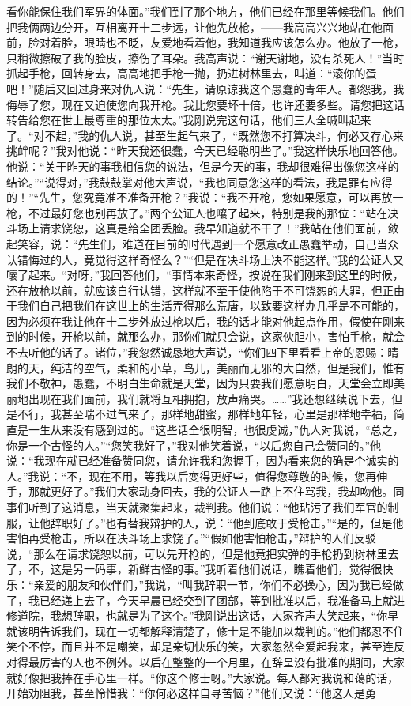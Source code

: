 看你能保住我们军界的体面。”我们到了那个地方，他们已经在那里等候我们。他们把我俩两边分开，互相离开十二步远，让他先放枪，——我高高兴兴地站在他面前，脸对着脸，眼睛也不眨，友爱地看着他，我知道我应该怎么办。他放了一枪，只稍微擦破了我的脸皮，擦伤了耳朵。我高声说：“谢天谢地，没有杀死人！”当时抓起手枪，回转身去，高高地把手枪一抛，扔进树林里去，叫道：“滚你的蛋吧！”随后又回过身来对仇人说：“先生，请原谅我这个愚蠢的青年人。都怨我，我侮辱了您，现在又迫使您向我开枪。我比您要坏十倍，也许还要多些。请您把这话转告给您在世上最尊重的那位太太。”我刚说完这句话，他们三人全喊叫起来了。“对不起，”我的仇人说，甚至生起气来了，“既然您不打算决斗，何必又存心来挑衅呢？”我对他说：“昨天我还很蠢，今天已经聪明些了。”我这样快乐地回答他。他说：“关于昨天的事我相信您的说法，但是今天的事，我却很难得出像您这样的结论。”“说得对，”我鼓鼓掌对他大声说，“我也同意您这样的看法，我是罪有应得的！”“先生，您究竟准不准备开枪？”我说：“我不开枪，您如果愿意，可以再放一枪，不过最好您也别再放了。”两个公证人也嚷了起来，特别是我的那位：“站在决斗场上请求饶恕，这真是给全团丢脸。我早知道就不干了！”我站在他们面前，敛起笑容，说：“先生们，难道在目前的时代遇到一个愿意改正愚蠢举动，自己当众认错悔过的人，竟觉得这样奇怪么？”“但是在决斗场上决不能这样。”我的公证人又嚷了起来。“对呀，”我回答他们，“事情本来奇怪，按说在我们刚来到这里的时候，还在放枪以前，就应该自行认错，这样就不至于使他陷于不可饶恕的大罪，但正由于我们自己把我们在这世上的生活弄得那么荒唐，以致要这样办几乎是不可能的，因为必须在我让他在十二步外放过枪以后，我的话才能对他起点作用，假使在刚来到的时候，开枪以前，就那么办，那你们就只会说，这家伙胆小，害怕手枪，就会不去听他的话了。诸位，”我忽然诚恳地大声说，“你们四下里看看上帝的恩赐：晴朗的天，纯洁的空气，柔和的小草，鸟儿，美丽而无邪的大自然，但是我们，惟有我们不敬神，愚蠢，不明白生命就是天堂，因为只要我们愿意明白，天堂会立即美丽地出现在我们面前，我们就将互相拥抱，放声痛哭。……”我还想继续说下去，但是不行，我甚至喘不过气来了，那样地甜蜜，那样地年轻，心里是那样地幸福，简直是一生从来没有感到过的。“这些话全很明智，也很虔诚，”仇人对我说，“总之，你是一个古怪的人。”“您笑我好了，”我对他笑着说，“以后您自己会赞同的。”他说：“我现在就已经准备赞同您，请允许我和您握手，因为看来您的确是个诚实的人。”我说：“不，现在不用，等我以后变得更好些，值得您尊敬的时候，您再伸手，那就更好了。”我们大家动身回去，我的公证人一路上不住骂我，我却吻他。同事们听到了这消息，当天就聚集起来，裁判我。他们说：“他玷污了我们军官的制服，让他辞职好了。”也有替我辩护的人，说：“他到底敢于受枪击。”“是的，但是他害怕再受枪击，所以在决斗场上求饶了。”“假如他害怕枪击，”辩护的人们反驳说，“那么在请求饶恕以前，可以先开枪的，但是他竟把实弹的手枪扔到树林里去了，不，这是另一码事，新鲜古怪的事。”我听着他们说话，瞧着他们，觉得很快乐：“亲爱的朋友和伙伴们，”我说，“叫我辞职一节，你们不必操心，因为我已经做了，我已经递上去了，今天早晨已经交到了团部，等到批准以后，我准备马上就进修道院，我想辞职，也就是为了这个。”我刚说出这话，大家齐声大笑起来，“你早就该明告诉我们，现在一切都解释清楚了，修士是不能加以裁判的。”他们都忍不住笑个不停，而且并不是嘲笑，却是亲切快乐的笑，大家忽然全爱起我来，甚至连反对得最厉害的人也不例外。以后在整整的一个月里，在辞呈没有批准的期间，大家就好像把我捧在手心里一样。“你这个修士呀。”大家说。每人都对我说和蔼的话，开始劝阻我，甚至怜惜我：“你何必这样自寻苦恼？”他们又说：“他这人是勇